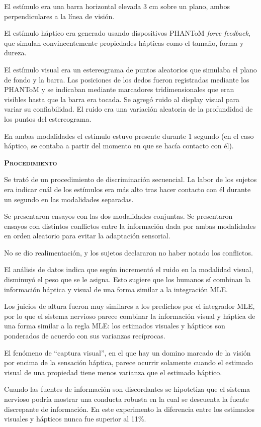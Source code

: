 \documentclass[a4paper,12pt]{article}
\begin{document}
El estímulo era una barra horizontal elevada 3 cm sobre un plano, ambos perpendiculares a la línea de visión. 

El estímulo háptico era generado usando dispositivos PHANToM {\itshape force feedback}, que simulan convincentemente propiedades hápticas como el tamaño, forma y dureza.

El estímulo visual era un estereograma de puntos aleatorios que simulaba el plano de fondo y la barra. Las posiciones de los dedos fueron registradas mediante los PHANToM y se indicaban mediante marcadores tridimensionales que eran visibles hasta que la barra era tocada. Se agregó ruido al display visual para variar su confiabilidad. El ruido era una variación aleatoria de la profundidad de los puntos del estereograma.

En ambas modalidades el estímulo estuvo presente durante 1 segundo (en el caso háptico, se contaba a partir del momento en que se hacía contacto con él).

{\scshape\bfseries Procedimiento}

Se trató de un procedimiento de discriminación secuencial. La labor de los sujetos era indicar cuál de los estímulos era más alto tras hacer contacto con él durante un segundo en las modalidades separadas. 

Se presentaron ensayos con las dos modalidades conjuntas. Se presentaron ensayos con distintos conflictos entre la información dada por ambas modalidades en orden aleatorio para evitar la adaptación sensorial. 

No se dio realimentación, y los sujetos declararon no haber notado los conflictos.

El análisis de datos indica que según incrementó el ruido en la modalidad visual, disminuyó el peso que se le asigna. Esto sugiere que los humanos sí combinan la información háptica y visual de una forma similar a la integración MLE.

Los juicios de altura fueron muy similares a los predichos por el integrador MLE, por lo que el sistema nervioso parece combinar la información visual y háptica de una forma similar a la regla MLE: los estimados visuales y hápticos son ponderados de acuerdo con sus varianzas recíprocas. 

El fenómeno de ``captura visual'', en el que hay un domino marcado de la visión por encima de la sensación háptica, parece ocurrir solamente cuando el estimado visual de una propiedad tiene menos varianza que el estimado háptico.

Cuando las fuentes de información son discordantes se hipotetiza que el sistema nervioso podría mostrar una conducta robusta en la cual se descuenta la fuente discrepante de información. En este experimento la diferencia entre los estimados visuales y hápticos nunca fue superior al 11\%. 
\end{document}

